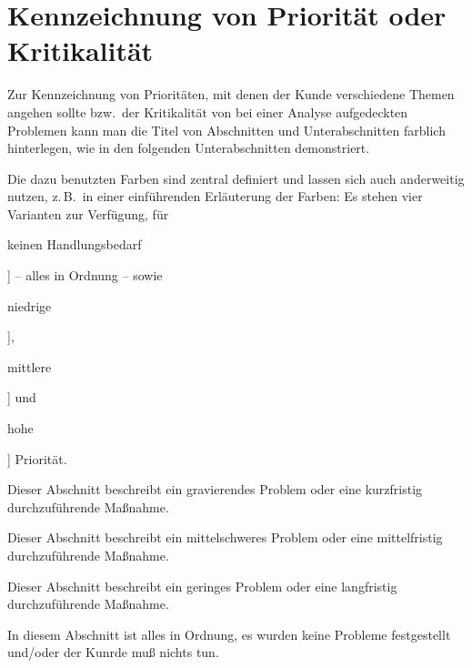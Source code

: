 \section{Kennzeichnung von Priorität oder Kritikalität}
\label{sec:priorities}
Zur Kennzeichnung von Prioritäten, mit denen der Kunde verschiedene Themen
angehen sollte bzw.\ der Kritikalität von bei einer Analyse aufgedeckten
Problemen kann man die Titel von Abschnitten und Unterabschnitten farblich
hinterlegen, wie in den folgenden Unterabschnitten demonstriert.

Die dazu benutzten Farben sind zentral definiert und lassen sich auch
anderweitig nutzen, z.\,B.\ in einer einführenden Erläuterung der Farben:
Es stehen vier Varianten zur Verfügung, für
\colorbox{priorityfine}{\strut{}keinen Handlungsbedarf}] -- alles in Ordnung
-- sowie \colorbox{prioritylow}{\strut{}niedrige}],
\colorbox{prioritymed}{\strut{}mittlere}] und
\colorbox{priorityhigh}{\strut{}hohe}] Priorität.

Dieser Abschnitt beschreibt ein gravierendes Problem oder eine kurzfristig
durchzuführende Maßnahme.

Dieser Abschnitt beschreibt ein mittelschweres Problem oder eine
mittelfristig durchzuführende Maßnahme.

Dieser Abschnitt beschreibt ein geringes Problem oder eine langfristig
durchzuführende Maßnahme.

In diesem Abschnitt ist alles in Ordnung, es wurden keine Probleme
festgestellt und/oder der Kunrde muß nichts tun.